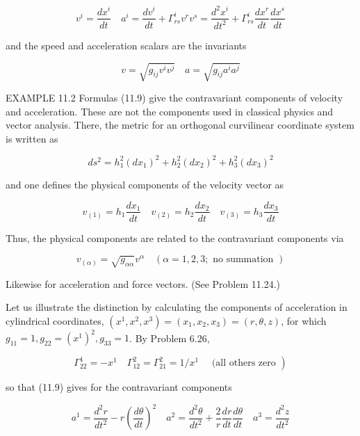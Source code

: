 \documentclass[10pt]{article}
\begin{document}
\begin{equation*}
v^{i}=\frac{d x^{i}}{d t} \quad a^{i}=\frac{d v^{i}}{d t}+\Gamma_{r s}^{i} v^{r} v^{s}=\frac{d^{2} x^{i}}{d t^{2}}+\Gamma_{r s}^{i} \frac{d x^{r}}{d t} \frac{d x^{s}}{d t} \tag{11.9}
\end{equation*}


and the speed and acceleration scalars are the invariants


\begin{equation*}
v=\sqrt{g_{i j} v^{i} v^{j}} \quad a=\sqrt{g_{i j} a^{i} a^{j}} \tag{11.10}
\end{equation*}


EXAMPLE 11.2 Formulas (11.9) give the contravariant components of velocity and acceleration. These are not the components used in classical physics and vector analysis. There, the metric for an orthogonal curvilinear coordinate system is written as

$$
d s^{2}=h_{1}^{2}\left(d x_{1}\right)^{2}+h_{2}^{2}\left(d x_{2}\right)^{2}+h_{3}^{2}\left(d x_{3}\right)^{2}
$$

and one defines the physical components of the velocity vector as

$$
v_{(1)}=h_{1} \frac{d x_{1}}{d t} \quad v_{(2)}=h_{2} \frac{d x_{2}}{d t} \quad v_{(3)}=h_{3} \frac{d x_{3}}{d t}
$$

Thus, the physical components are related to the contravariant components via


\begin{equation*}
v_{(\alpha)}=\sqrt{g_{\alpha \alpha}} v^{\alpha} \quad(\alpha=1,2,3 ; \text { no summation }) \tag{1}
\end{equation*}


Likewise for acceleration and force vectors. (See Problem 11.24.)

Let us illustrate the distinction by calculating the components of acceleration in cylindrical coordinates, $\left(x^{1}, x^{2}, x^{3}\right)=\left(x_{1}, x_{2}, x_{3}\right)=(r, \theta, z)$, for which $g_{11}=1, g_{22}=\left(x^{1}\right)^{2}, g_{33}=1$. By Problem 6.26,

$$
\left.\Gamma_{22}^{1}=-x^{1} \quad \Gamma_{12}^{2}=\Gamma_{21}^{2}=1 / x^{1} \quad \text { (all others zero }\right)
$$

so that (11.9) gives for the contravariant components


\begin{equation*}
a^{1}=\frac{d^{2} r}{d t^{2}}-r\left(\frac{d \theta}{d t}\right)^{2} \quad a^{2}=\frac{d^{2} \theta}{d t^{2}}+\frac{2}{r} \frac{d r}{d t} \frac{d \theta}{d t} \quad a^{3}=\frac{d^{2} z}{d t^{2}} \tag{2}
\end{equation*}
\end{document}

